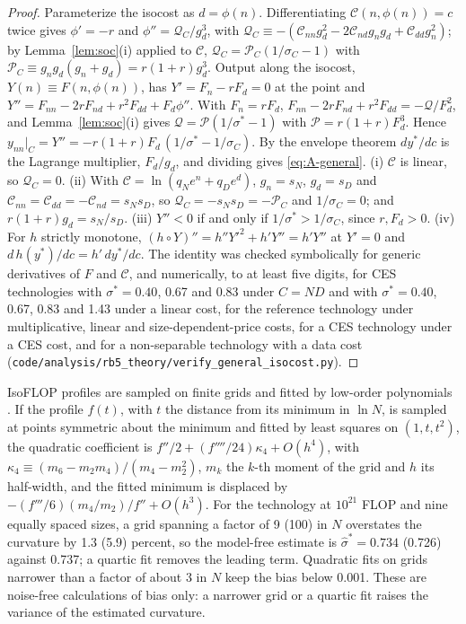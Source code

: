 \begin{proof}
Parameterize the isocost as $d=\phi(n)$. Differentiating $\mathcal C(n,\phi(n))=c$ twice gives $\phi'=-r$ and
$\phi''=\mathcal Q_C/g_d^3$, with $\mathcal Q_C\equiv-(\mathcal C_{nn}g_d^2-2\mathcal C_{nd}g_ng_d+\mathcal C_{dd}g_n^2)$; by
Lemma~\ref{lem:soc}(i) applied to $\mathcal C$, $\mathcal Q_C=\mathcal P_C(1/\sigma_C-1)$ with
$\mathcal P_C\equiv g_ng_d(g_n+g_d)=r(1+r)g_d^3$. Output along the isocost, $Y(n)\equiv F(n,\phi(n))$, has
$Y'=F_n-rF_d=0$ at the point and $Y''=F_{nn}-2rF_{nd}+r^2F_{dd}+F_d\phi''$. With $F_n=rF_d$,
$F_{nn}-2rF_{nd}+r^2F_{dd}=-\mathcal Q/F_d^2$, and Lemma~\ref{lem:soc}(i) gives $\mathcal Q=\mathcal P(1/\sigma^*-1)$ with
$\mathcal P=r(1+r)F_d^3$. Hence $y_{nn}|_C=Y''=-r(1+r)F_d\,(1/\sigma^*-1/\sigma_C)$. By the envelope theorem $dy^*/dc$ is
the Lagrange multiplier, $F_d/g_d$, and dividing gives \eqref{eq:A-general}. (i) $\mathcal C$ is linear, so
$\mathcal Q_C=0$. (ii) With $\mathcal C=\ln(q_Ne^n+q_De^d)$, $g_n=s_N$, $g_d=s_D$ and
$\mathcal C_{nn}=\mathcal C_{dd}=-\mathcal C_{nd}=s_Ns_D$, so $\mathcal Q_C=-s_Ns_D=-\mathcal P_C$ and $1/\sigma_C=0$; and
$r(1+r)g_d=s_N/s_D$. (iii) $Y''<0$ if and only if $1/\sigma^*>1/\sigma_C$, since $r,F_d>0$. (iv) For $h$ strictly
monotone, $(h\circ Y)''=h''Y'^2+h'Y''=h'Y''$ at $Y'=0$ and $d\,h(y^*)/dc=h'\,dy^*/dc$. The identity was checked
symbolically for generic derivatives of $F$ and $\mathcal C$, and numerically, to at least five digits, for CES
technologies with $\sigma^*=0.40$, 0.67 and 0.83 under $C=ND$ and with $\sigma^*=0.40$, 0.67, 0.83 and 1.43 under a linear
cost, for the reference technology under multiplicative, linear and size-dependent-price costs, for a CES technology
under a CES cost, and for a non-separable technology with a data cost
(\texttt{code/analysis/rb5\_theory/verify\_general\_isocost.py}).
\end{proof}

\begin{remark}\label{rem:A-grid}
IsoFLOP profiles are sampled on finite grids and fitted by low-order polynomials \citep{czech2026problems}. If the profile
$f(t)$, with $t$ the distance from its minimum in $\ln N$, is sampled at points symmetric about the minimum and fitted by
least squares on $(1,t,t^2)$, the quadratic coefficient is $f''/2+(f''''/24)\kappa_4+O(h^4)$, with
$\kappa_4\equiv(m_6-m_2m_4)/(m_4-m_2^2)$, $m_k$ the $k$-th moment of the grid and $h$ its half-width, and the fitted minimum
is displaced by $-(f'''/6)(m_4/m_2)/f''+O(h^3)$. For the \citet{besiroglu2024chinchilla} technology at $10^{21}$ FLOP and nine
equally spaced sizes, a grid spanning a factor of 9 (100) in $N$ overstates the curvature by 1.3 (5.9) percent, so the
model-free estimate is $\hat\sigma^*=0.734$ (0.726) against 0.737; a quartic fit removes the leading term. Quadratic fits
on grids narrower than a factor of about 3 in $N$ keep the bias below 0.001. These are noise-free calculations of bias
only: a narrower grid or a quartic fit raises the variance of the estimated curvature.
\end{remark}

